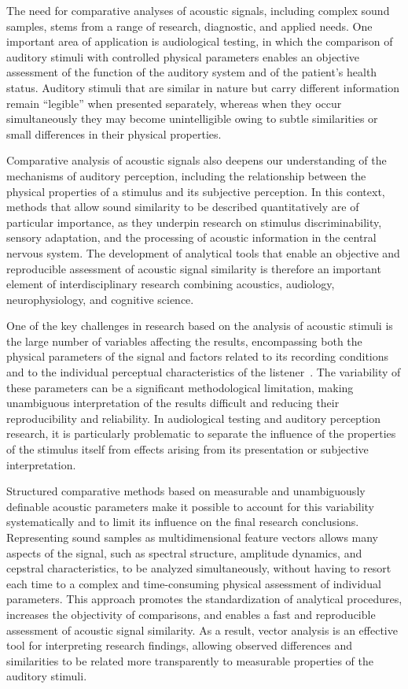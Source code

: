 \documentclass{article}
\begin{document}
The need for comparative analyses of acoustic signals, including complex sound samples, stems from a range of research, diagnostic, and applied needs. One important area of application is audiological testing, in which the comparison of auditory stimuli with controlled physical parameters enables an objective assessment of the function of the auditory system and of the patient's health status.
Auditory stimuli that are similar in nature but carry different information remain ``legible'' when presented separately, whereas when they occur simultaneously they may become unintelligible owing to subtle similarities or small differences in their physical properties.

Comparative analysis of acoustic signals also deepens our understanding of the mechanisms of auditory perception, including the relationship between the physical properties of a stimulus and its subjective perception. In this context, methods that allow sound similarity to be described quantitatively are of particular importance, as they underpin research on stimulus discriminability, sensory adaptation, and the processing of acoustic information in the central nervous system.
The development of analytical tools that enable an objective and reproducible assessment of acoustic signal similarity is therefore an important element of interdisciplinary research combining acoustics, audiology, neurophysiology, and cognitive science.

One of the key challenges in research based on the analysis of acoustic stimuli is the large number of variables affecting the results, encompassing both the physical parameters of the signal and factors related to its recording conditions and to the individual perceptual characteristics of the listener~\cite{Letowski1989SoundQuality}. The variability of these parameters can be a significant methodological limitation, making unambiguous interpretation of the results difficult and reducing their reproducibility and reliability. In audiological testing and auditory perception research, it is particularly problematic to separate the influence of the properties of the stimulus itself from effects arising from its presentation or subjective interpretation.

Structured comparative methods based on measurable and unambiguously definable acoustic parameters make it possible to account for this variability systematically and to limit its influence on the final research conclusions. Representing sound samples as multidimensional feature vectors allows many aspects of the signal, such as spectral structure, amplitude dynamics, and cepstral characteristics, to be analyzed simultaneously, without having to resort each time to a complex and time-consuming physical assessment of individual parameters. This approach promotes the standardization of analytical procedures, increases the objectivity of comparisons, and enables a fast and reproducible assessment of acoustic signal similarity. As a result, vector analysis is an effective tool for interpreting research findings, allowing observed differences and similarities to be related more transparently to measurable properties of the auditory stimuli.
\end{document}

